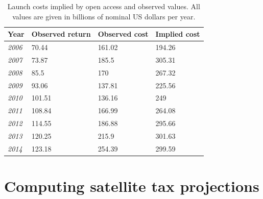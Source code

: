 \documentclass[12pt]{article}
\begin{document}
\begin{table}[]
	\centering
	\begin{tabular}{|l|l|l|l|}
		\hline
		Year & \multicolumn{1}{l|}{Observed return} & \multicolumn{1}{l|}{Observed cost} & \multicolumn{1}{l|}{Implied cost} \\ \hline
		\textit{2006} & 70.44                                & 161.02                             & 194.26                            \\ \hline
		\textit{2007} & 73.87                                & 185.5                              & 305.31                            \\ \hline
		\textit{2008} & 85.5                                 & 170                                & 267.32                            \\ \hline
		\textit{2009} & 93.06                                & 137.81                             & 225.56                            \\ \hline
		\textit{2010} & 101.51                               & 136.16                             & 249                               \\ \hline
		\textit{2011} & 108.84                               & 166.99                             & 264.08                            \\ \hline
		\textit{2012} & 114.55                               & 186.88                             & 295.66                            \\ \hline
		\textit{2013} & 120.25                               & 215.9                              & 301.63                            \\ \hline
		\textit{2014} & 123.18                               & 254.39                             & 299.59                            \\ \hline
	\end{tabular}
	\caption{Launch costs implied by open access and observed values. All values are given in billions of nominal US dollars per year.}
	\label{launchCosts}
\end{table}

\section{Computing satellite tax projections}
\end{document}
